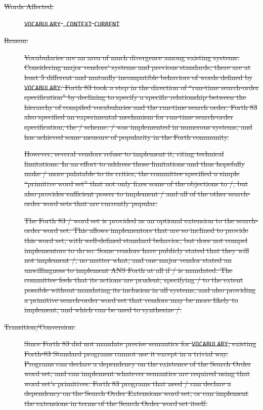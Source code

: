 \begin{description}
\item[\sout{Words Affected:}]
\sout{\texttt{VOCABULARY}	\texttt{ CONTEXT}	\texttt{CURRENT}}

\item[\sout{Reason:}]
\sout{%
	Vocabularies are an area of much divergence among existing systems.
	Considering major ven\-dors' systems and previous standards, there
	are at least 5 different and mutually incompatible behaviors of
	words defined by \texttt{VOCABULARY}. Forth 83 took a step in the
	direction of ``run-time search-order specification'' by declining
	to specify a specific relationship between the hierarchy of
	compiled vocabularies and the run-time search order. Forth 83 also
	specified an experimental mechanism for run-time search-order
	specification, the / scheme.
	/ was implemented in numerous
	systems, and has achieved some measure of popularity in the Forth
	community.}

\sout{%
	However, several vendors refuse to implement it, citing technical
	limitations. In an effort to address those limitations and thus
	hopefully make / more
	palatable to its critics, the committee specified a simple
	``primitive word set'' that not only fixes some of the objections
	to /, but also provides
	sufficient power to implement /
	and all of the other search-order word sets that are currently
	popular.}

\sout{%
	The Forth 83 / word set is
	provided as an optional extension to the search-order word set.
	This allows implementors that are so inclined to provide this
	word set, with well-defined standard behavior, but does not
	compel implementors to do so. Some vendors have publicly stated
	that they will not implement /,
	no matter what, and one major vendor stated an unwillingness to
	implement ANS Forth at all if /
	is mandated. The committee feels that its actions are prudent,
	specifying / to the extent
	possible without mandating its inclusion in all systems, and also
	providing a primitive search-order word set that vendors may be
	more likely to implement, and which can be used to synthesize
	/.}

\item[\sout{Transition/Conversion:}]
\sout{%
	Since Forth 83 did not mandate precise semantics for \texttt{VOCABULARY},
	existing Forth-83 Standard programs cannot use it except in a
	trivial way. Programs can declare a dependency on the existence
	of the Search Order word set, and can implement whatever semantics
	are required using that word set's primitives. Forth 83 programs
	that need / can declare a
	dependency on the Search Order Extensions word set, or can implement
	the extensions in terms of the Search Order word set itself.}
\end{description}


